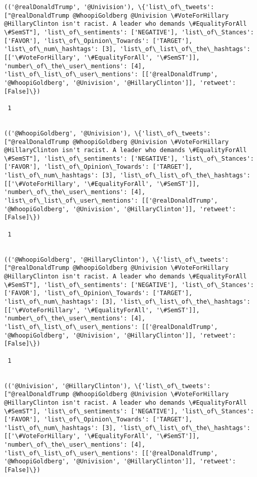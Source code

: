 \documentclass[11pt]{article}
\begin{document}
\begin{Verbatim}[commandchars=\\\{\}]
(('@realDonaldTrump', '@Univision'), \{'list\_of\_tweets': ["@realDonaldTrump @WhoopiGoldberg @Univision \#VoteForHillary @HillaryClinton isn't racist. A leader who demands \#EqualityForAll \#SemST"], 'list\_of\_sentiments': ['NEGATIVE'], 'list\_of\_Stances': ['FAVOR'], 'list\_of\_Opinion\_Towards': ['TARGET'], 'list\_of\_num\_hashtags': [3], 'list\_of\_list\_of\_the\_hashtags': [['\#VoteForHillary', '\#EqualityForAll', '\#SemST']], 'number\_of\_the\_user\_mentions': [4], 'list\_of\_list\_of\_user\_mentions': [['@realDonaldTrump', '@WhoopiGoldberg', '@Univision', '@HillaryClinton']], 'retweet': [False]\})

 1
 

(('@WhoopiGoldberg', '@Univision'), \{'list\_of\_tweets': ["@realDonaldTrump @WhoopiGoldberg @Univision \#VoteForHillary @HillaryClinton isn't racist. A leader who demands \#EqualityForAll \#SemST"], 'list\_of\_sentiments': ['NEGATIVE'], 'list\_of\_Stances': ['FAVOR'], 'list\_of\_Opinion\_Towards': ['TARGET'], 'list\_of\_num\_hashtags': [3], 'list\_of\_list\_of\_the\_hashtags': [['\#VoteForHillary', '\#EqualityForAll', '\#SemST']], 'number\_of\_the\_user\_mentions': [4], 'list\_of\_list\_of\_user\_mentions': [['@realDonaldTrump', '@WhoopiGoldberg', '@Univision', '@HillaryClinton']], 'retweet': [False]\})

 1
 

(('@WhoopiGoldberg', '@HillaryClinton'), \{'list\_of\_tweets': ["@realDonaldTrump @WhoopiGoldberg @Univision \#VoteForHillary @HillaryClinton isn't racist. A leader who demands \#EqualityForAll \#SemST"], 'list\_of\_sentiments': ['NEGATIVE'], 'list\_of\_Stances': ['FAVOR'], 'list\_of\_Opinion\_Towards': ['TARGET'], 'list\_of\_num\_hashtags': [3], 'list\_of\_list\_of\_the\_hashtags': [['\#VoteForHillary', '\#EqualityForAll', '\#SemST']], 'number\_of\_the\_user\_mentions': [4], 'list\_of\_list\_of\_user\_mentions': [['@realDonaldTrump', '@WhoopiGoldberg', '@Univision', '@HillaryClinton']], 'retweet': [False]\})

 1
 

(('@Univision', '@HillaryClinton'), \{'list\_of\_tweets': ["@realDonaldTrump @WhoopiGoldberg @Univision \#VoteForHillary @HillaryClinton isn't racist. A leader who demands \#EqualityForAll \#SemST"], 'list\_of\_sentiments': ['NEGATIVE'], 'list\_of\_Stances': ['FAVOR'], 'list\_of\_Opinion\_Towards': ['TARGET'], 'list\_of\_num\_hashtags': [3], 'list\_of\_list\_of\_the\_hashtags': [['\#VoteForHillary', '\#EqualityForAll', '\#SemST']], 'number\_of\_the\_user\_mentions': [4], 'list\_of\_list\_of\_user\_mentions': [['@realDonaldTrump', '@WhoopiGoldberg', '@Univision', '@HillaryClinton']], 'retweet': [False]\})


\end{Verbatim}
\end{document}

